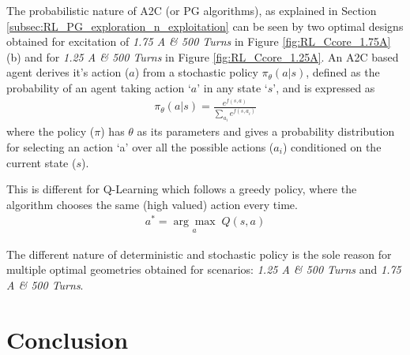 \clearpage
\newpage

The probabilistic nature of A2C (or PG algorithms), as explained in Section \ref{subsec:RL_PG_exploration_n_exploitation} can be seen by two optimal designs obtained for excitation of \textit{1.75 A \& 500 Turns} in Figure \ref{fig:RL_Ccore_1.75A} (b) and for \textit{1.25 A \& 500 Turns} in Figure \ref{fig:RL_Ccore_1.25A}. 
An A2C based agent derives it's action ($a$) from a stochastic policy $\pi_{\theta}(a|s)$, defined as the probability of an agent taking action `$a$' in any state `$s$', and is expressed as 
\begin{align}
    \pi_{\theta}(a|s) = \frac{e^{f(s, a)}}{\sum_{a_i} e^{f(s, a_i)}} \label{eqn:RL_A2C_probabilistic2}
\end{align}
where the policy ($\pi$) has $\theta$ as its parameters and gives a probability distribution for selecting an action `a' over all the possible actions ($a_i$) conditioned on the current state ($s$).
 
This is different for Q-Learning which follows a greedy policy, where the algorithm chooses the same (high valued) action every time. 
\begin{align}
    a^* = \underset{a}{\arg\max} \; Q(s, a)
    \label{eqn:QL_not_probabilistic}
\end{align}

The different nature of deterministic and stochastic policy is the sole reason for multiple optimal geometries obtained for scenarios: \textit{1.25 A \& 500 Turns} and \textit{1.75 A \& 500 Turns}.

\section{Conclusion}

